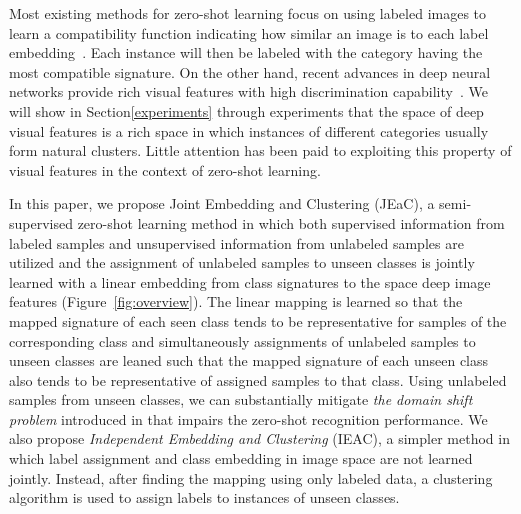 \documentclass[letterpaper]{article}
\begin{document}
Most existing methods for zero-shot learning focus on using labeled images to learn a compatibility function indicating how similar an image is
to each label embedding~\cite{Akata2015,emb15,sse}. Each instance will then be labeled with the category having the most compatible signature.
 On the other hand, recent advances in deep neural networks provide rich visual features with high discrimination capability~\cite{vgg}.
We will show in Section\ref{experiments} through experiments that the space of deep visual features is a rich space
 in which instances of different categories usually form natural clusters.
Little attention has been paid to exploiting this property of visual features in the context of zero-shot learning.


In this paper, we propose Joint Embedding and Clustering (JEaC),
a semi-supervised zero-shot learning method in which both supervised information from labeled samples
and unsupervised information from unlabeled samples are utilized and the assignment of unlabeled samples to unseen classes is jointly learned
with a linear embedding from class signatures to the space deep image features (Figure~\ref{fig:overview}).
The linear mapping is learned so that the mapped signature of each seen class tends to be representative
for samples of the corresponding class and simultaneously
assignments of unlabeled samples to unseen classes are leaned such that the mapped signature of each unseen class
 also tends to be representative of assigned samples to that class.
Using unlabeled samples from unseen classes, we can substantially mitigate
 \textit{the domain shift problem} introduced in \cite{eccv14} that impairs the zero-shot recognition performance.
We also propose \textit{Independent Embedding and Clustering} (IEAC),
a simpler method in which label assignment and class embedding in image space are not learned jointly.
Instead, after finding the mapping using only labeled data, a clustering algorithm is used to assign labels to instances of unseen classes.
\end{document}

